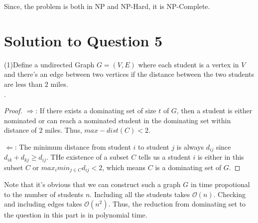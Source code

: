\documentclass[11pt]{article}
\renewcommand{\O}{\mathcal{O}}
\begin{document}
   Since, the problem is both in NP and NP-Hard, it is NP-Complete.

\newpage
\section{Solution to Question 5} 
(1)Define a undirected Graph $G = (V, E)$ where each student is a vertex in $V$ and there's an edge between two vertices if the distance between the two students are less than $2$ miles. \\

.

\begin{proof}
$\Rightarrow$: If there exists a dominating set of size $t$ of $G$, then a student is either nominated or can reach a nominated student in the dominating set within distance of $2$ miles.
Thus, $max-dist(C) < 2$.

$\Leftarrow$: The minimum distance from student $i$ to student $j$ is always $d_{ij}$ since $d_{ik} + d_{kj} \geq d_{ij}$. THe existence of a subset $C$ tells us a student $i$ is either in this subset $C$ or $max_imin_{j \in C} d_{ij} < 2$, which means $C$ is a dominating set of $G$.
\end{proof}

\noindent Note that it's obvious that we can construct such a graph $G$ in time propotional to the number of students $n$.
Including all the students takes $\O(n)$.
Checking and including edges takes $\O(n^2)$.
Thus, the reduction from dominating set to the question in this part is in polynomial time.
\end{document}
